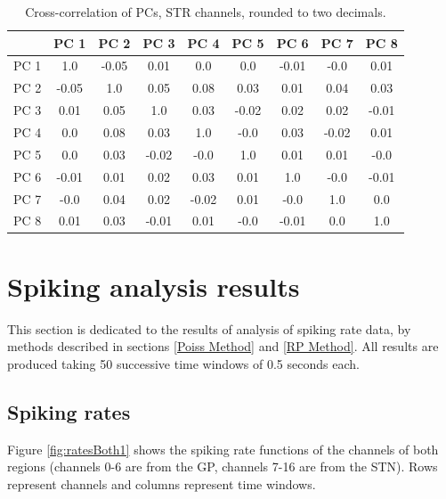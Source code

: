 \documentclass{kththesis}
\begin{document}
\begin{table}[H]
    \centering
    \begin{tabular}{|c|c|c|c|c|c|c|c|c|}
    \hline
          &  PC 1 &  PC 2 &  PC 3 &  PC 4 &  PC 5 &  PC 6 &  PC 7 &  PC 8 \\ \hline
     PC 1 &  1.0  & -0.05 &  0.01 &  0.0  &  0.0  & -0.01 & -0.0  &  0.01 \\ \hline
     PC 2 & -0.05 &  1.0  &  0.05 &  0.08 &  0.03 &  0.01 &  0.04 &  0.03 \\ \hline
     PC 3 &  0.01 &  0.05 &  1.0  &  0.03 & -0.02 &  0.02 &  0.02 & -0.01 \\ \hline
     PC 4 &  0.0  &  0.08 &  0.03 &  1.0  & -0.0  &  0.03 & -0.02 &  0.01 \\ \hline
     PC 5 &  0.0  &  0.03 & -0.02 & -0.0  &  1.0  &  0.01 &  0.01 & -0.0  \\ \hline
     PC 6 & -0.01 &  0.01 &  0.02 &  0.03 &  0.01 &  1.0 &  -0.0  & -0.01 \\ \hline
     PC 7 & -0.0  &  0.04 &  0.02 & -0.02 &  0.01 & -0.0 &   1.0  &  0.0  \\ \hline
     PC 8 &  0.01 &  0.03 & -0.01 &  0.01 & -0.0  & -0.01 &  0.0  &  1.0  \\ \hline
    \end{tabular}
    \caption{Cross-correlation of PCs, STR channels, rounded to two decimals.}
    \label{tab:corrcoefSTR}
\end{table}

\section{Spiking analysis results}\label{SA res}

This section is dedicated to the results of analysis of spiking rate data, by methods described in sections \ref{Poiss Method} and \ref{RP Method}.
All results are produced taking 50 successive time windows of 0.5 seconds each.

\subsection{Spiking rates}

Figure \ref{fig:ratesBoth1} shows the spiking rate functions of the channels of both regions (channels 0-6 are from the GP, channels 7-16 are from the STN). Rows represent channels and columns represent time windows. 
\end{document}
